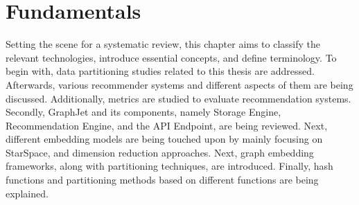 \chapter{Fundamentals}
\label{chap:fundamentals}
Setting the scene for a systematic review, this chapter aims to classify the relevant technologies, introduce essential concepts, and define terminology. To begin with, data partitioning studies related to this thesis are addressed. Afterwards, various recommender systems and different aspects of them are being discussed. Additionally, metrics are studied to evaluate recommendation systems. Secondly, GraphJet and its components, namely Storage Engine, Recommendation Engine, and the API Endpoint, are being reviewed. Next, different embedding models are being touched upon by mainly focusing on StarSpace, and dimension reduction approaches. Next, graph embedding frameworks, along with partitioning techniques, are introduced. Finally, hash functions and partitioning methods based on different functions are being explained.
